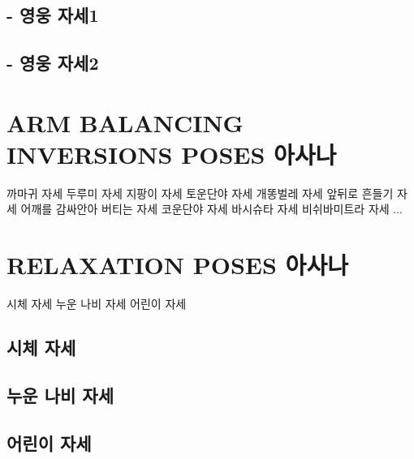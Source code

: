\documentclass[12pt, a4paper, oneside]{book}
\let\stdsection\section
\renewcommand\section{\newpage\stdsection}
\begin{document}
	\section{ - 영웅 자세1 }
	
	\section{ - 영웅 자세2}
	




	\chapter{ARM BALANCING INVERSIONS POSES 아사나}
	\newpage
	\minitoc


	까마귀 자세
	두루미 자세
	지팡이 자세
	토운단야 자세
	개똥벌레 자세
	앞뒤로 흔들기 자세
	어깨를 감싸안아 버티는 자세
	코운단야 자세
	바시슈타 자세
	비쉬바미트라 자세
	...

	\chapter{RELAXATION POSES 아사나}
	\newpage
	\minitoc


	시체 자세
	누운 나비 자세
	어린이 자세

	\section{시체 자세}
	\section{	누운 나비 자세}
	\section{	어린이 자세}


%
\end{document}
